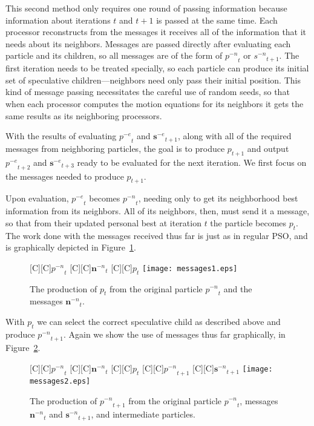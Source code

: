 \documentclass[journal,letterpaper]{IEEEtran}
\newcommand{\fig}[1]{Figure~\ref{fig:#1}}
\providecommand{\noeval}[1]{\ensuremath{#1^{-e}}}
\providecommand{\nonbest}[1]{\ensuremath{#1^{-n}}}
\providecommand{\p}{\ensuremath{p}}
\providecommand{\s}{\ensuremath{s}}
\providecommand{\sset}{\ensuremath{\mathbf{s}}}
\providecommand{\nset}{\ensuremath{\mathbf{n}}}
\begin{document}
This second method only requires one round of passing information because
information about iterations $t$ and $t+1$ is passed at the same time.  Each
processor reconstructs from the messages it receives all of the information
that it needs about its neighbors.  Messages are passed directly after
evaluating each particle and its children, so all messages are of the form of
$\nonbest{\p}_t$ or $\nonbest{\s}_{t+1}$.  The first iteration needs to be
treated specially, so each particle can produce its initial set of speculative
children---neighbors need only pass their initial position.  This kind of
message passing necessitates the careful use of random seeds, so that when each
processor computes the motion equations for its neighbors it gets the same
results as its neighboring processors.

With the results of evaluating $\noeval{\p}_t$ and $\noeval{\sset}_{t+1}$,
along with all of the required messages from neighboring particles, the goal is
to produce $\p_{t+1}$ and output $\noeval{\p}_{t+2}$ and $\noeval{\sset}_{t+3}$
ready to be evaluated for the next iteration.  We first focus on the messages
needed to produce $\p_{t+1}$.

Upon evaluation, $\noeval{\p}_t$ becomes $\nonbest{\p}_t$, needing only to get
its neighborhood best information from its neighbors.  All of its neighbors,
then, must send it a message, so that from their updated personal best at
iteration $t$ the particle becomes $\p_t$.  The work done with the messages
received thus far is just as in regular PSO, and is graphically depicted in 
\fig{messages1}.

\begin{figure}
  \centering
  [C][C]{$\nonbest{\p}_{t}$}
  [C][C]{$\nonbest{\nset}_{t}$}
  [C][C]{$\p_{t}$}
  \texttt{[image: messages1.eps]}
  \caption{The production of $\p_{t}$ from the original particle
  $\nonbest{\p}_{t}$ and the messages $\nonbest{\nset}_{t}$.}
  \label{fig:messages1}
\end{figure}

With $\p_t$ we can select the correct speculative child as described above and
produce $\nonbest{\p}_{t+1}$.  Again we show the use of messages thus far
graphically, in \fig{messages2}.  

\begin{figure}
  \centering
  [C][C]{$\nonbest{\p}_{t}$}
  [C][C]{$\nonbest{\nset}_{t}$}
  [C][C]{$\p_{t}$}
  [C][C]{$\nonbest{\p}_{t+1}$}
  [C][C]{$\nonbest{\sset}_{t+1}$}
  \texttt{[image: messages2.eps]}
  \caption{The production of $\nonbest{\p}_{t+1}$ from the original particle 
  $\nonbest{\p}_{t}$, messages $\nonbest{\nset}_{t}$ and
  $\nonbest{\sset}_{t+1}$, and intermediate particles.}
  \label{fig:messages2}
\end{figure}
\end{document}

